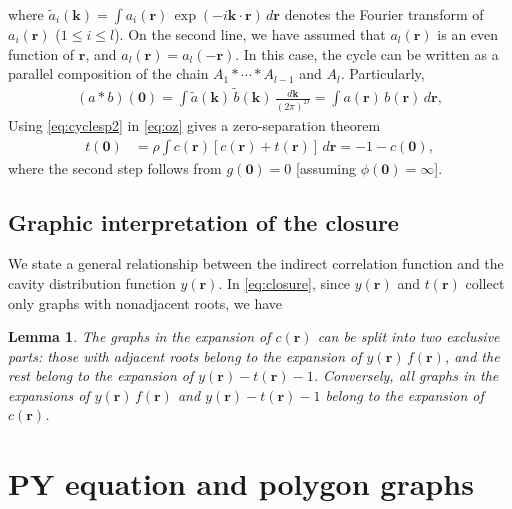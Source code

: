 \documentclass[preprint]{revtex4-1}
\newtheorem{lemm}[thrm]{Lemma}
\newcommand{\vct}[1]{\mathbf{#1}}
\providecommand{\vr}{} %
\renewcommand{\vr}{\vct{r}}
\newcommand{\vk}{\vct{k}}
\newcommand{\dvk}{\frac{d\vk}{(2\pi)^D}}
\begin{document}
%
where
  $\tilde{a}_i(\vk) = \int a_i(\vr) \, \exp(-i \vk \cdot \vr) \, d\vr$
  denotes the Fourier transform of $a_i(\vr)$ ($1 \le i \le l$).
%
On the second line,
  we have assumed that
  $a_l(\vr)$ is an even function of $\vr$,
  and
  $a_l(\vr) = a_l(-\vr)$.
%
In this case,
  the cycle can be written as a parallel composition
  of the chain $A_1 * \cdots * A_{l-1}$ and $A_l$.
%
Particularly,
%
\begin{align}
      (a * b)(\vct{0})
  =
      \int \tilde{a}(\vk) \, \tilde{b}(\vk) \, \dvk
  =
      \int a(\vr) \, b(\vr) \, d\vr,
\label{eq:cyclesp2}
\end{align}
%
Using \eqref{eq:cyclesp2} in \eqref{eq:oz} gives
  a zero-separation theorem\cite{rosenfeld1978}
%
\begin{align}
  t(\vct{0})
  &= \rho \int c(\vr) [c(\vr) + t(\vr)] \, d\vr
  = -1 - c(\vct{0}),
\label{eq:zerosep}
\end{align}
%
where the second step follows from
  $g(\vct{0}) = 0$ [assuming $\phi(\vct{0}) = \infty$].





\subsection{Graphic interpretation of the closure}



We state a general relationship between the indirect correlation function
  and the cavity distribution function $y(\vr)$.
%
In \eqref{eq:closure},
since $y(\vr)$ and $t(\vr)$
collect only graphs with nonadjacent roots,
we have
%
\begin{lemm}
The graphs in the expansion of $c(\vr)$
  can be split into two exclusive parts:
  those with adjacent roots belong to
  the expansion of $y(\vr)\, f(\vr)$,
  and the rest belong to
  the expansion of $y(\vr) - t(\vr) - 1$.
Conversely,
  all graphs in the expansions of $y(\vr) \, f(\vr)$
  and $y(\vr) - t(\vr) - 1$ belong to
  the expansion of $c(\vr)$.
\label{thm:crsplit}
\end{lemm}
%





\section{\label{sec:py}PY equation and polygon graphs}
\end{document}

